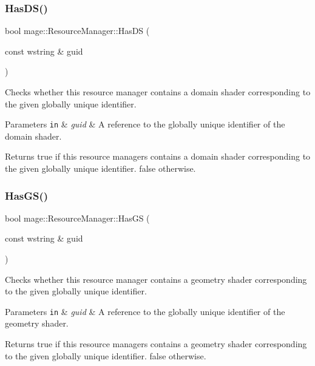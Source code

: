 \subsubsection{\texorpdfstring{Has\+D\+S()}{HasDS()}}
{\footnotesize\ttfamily bool mage\+::\+Resource\+Manager\+::\+Has\+DS (\begin{DoxyParamCaption}\item[{const wstring \&}]{guid }\end{DoxyParamCaption})\hspace{0.3cm}{\ttfamily [noexcept]}}

Checks whether this resource manager contains a domain shader corresponding to the given globally unique identifier.


\begin{DoxyParams}[1]{Parameters}
\mbox{\tt in}  & {\em guid} & A reference to the globally unique identifier of the domain shader. \\
\hline
\end{DoxyParams}
\begin{DoxyReturn}{Returns}
{\ttfamily true} if this resource managers contains a domain shader corresponding to the given globally unique identifier. {\ttfamily false} otherwise. 
\end{DoxyReturn}
\hypertarget{classmage_1_1_resource_manager_aa93e710727fb3b6351317a7eddec376c}{}\label{classmage_1_1_resource_manager_aa93e710727fb3b6351317a7eddec376c} 
\subsubsection{\texorpdfstring{Has\+G\+S()}{HasGS()}}
{\footnotesize\ttfamily bool mage\+::\+Resource\+Manager\+::\+Has\+GS (\begin{DoxyParamCaption}\item[{const wstring \&}]{guid }\end{DoxyParamCaption})\hspace{0.3cm}{\ttfamily [noexcept]}}

Checks whether this resource manager contains a geometry shader corresponding to the given globally unique identifier.


\begin{DoxyParams}[1]{Parameters}
\mbox{\tt in}  & {\em guid} & A reference to the globally unique identifier of the geometry shader. \\
\hline
\end{DoxyParams}
\begin{DoxyReturn}{Returns}
{\ttfamily true} if this resource managers contains a geometry shader corresponding to the given globally unique identifier. {\ttfamily false} otherwise. 
\end{DoxyReturn}
\hypertarget{classmage_1_1_resource_manager_a9283ce235899255af209d3166cd67efc}{}\label{classmage_1_1_resource_manager_a9283ce235899255af209d3166cd67efc} 
